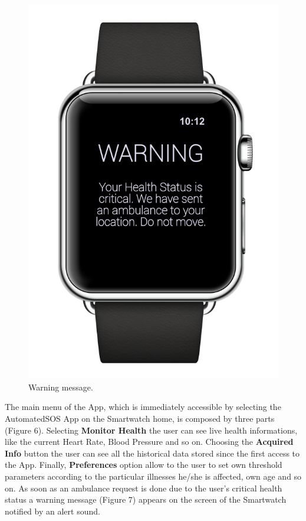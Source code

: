 \begin{enumerate}
\begin{figure}
\begin{center}
\begin{minipage}[c]{.40\textwidth}
          \includegraphics[height=12 cm]{Images/Mockups/AutomatedSOSMockup7.png}
          	\caption{Warning message.}
        \end{minipage}
      \end{center}
\end{figure}
The main menu of the App, which is immediately accessible by selecting the AutomatedSOS App on the Smartwatch home, is composed by three parts (Figure 6). Selecting \textbf{Monitor Health} the user can see live health informations, like the current Heart Rate, Blood Pressure and so on. Choosing the \textbf{Acquired Info} button the user can see all the historical data stored since the first access to the App. Finally, \textbf{Preferences} option allow to the user to set own threshold parameters according to the particular illnesses he/she is affected, own age and so on. As soon as an ambulance request is done due to the user's critical health status a warning message (Figure 7) appears on the screen of the Smartwatch notified by an alert sound.
\clearpage


\end{enumerate}
